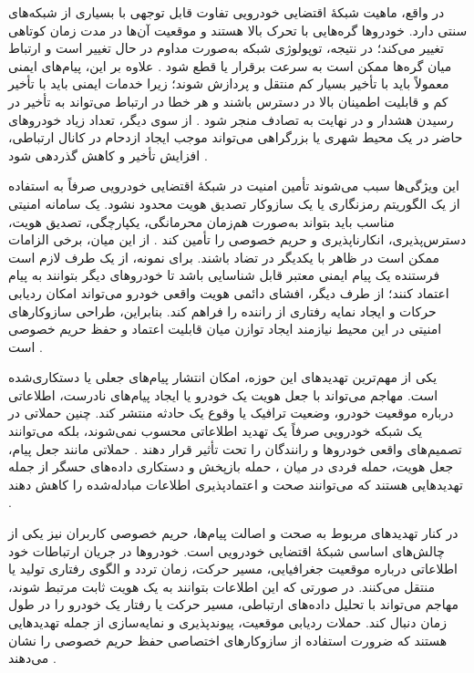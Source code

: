 \documentclass[12pt,a4paper]{article}
\begin{document}
در واقع، ماهیت شبکهٔ اقتضایی خودرویی تفاوت قابل توجهی با بسیاری از شبکه‌های سنتی دارد. خودرو‌ها گره‌هایی با تحرک بالا هستند و موقعیت آن‌ها در مدت زمان کوتاهی تغییر می‌کند؛ در نتیجه، توپولوژی شبکه به‌صورت مداوم در حال تغییر است و ارتباط میان گره‌ها ممکن است به سرعت برقرار یا قطع شود \cite{luConnectedVehiclesSolutions2014,hozouriOverviewVANETVehicular2023}. علاوه بر این، پیام‌های ایمنی معمولاً باید با تأخیر بسیار کم منتقل و پردازش شوند؛ زیرا خدمات ایمنی باید با تأخیر کم و قابلیت اطمینان بالا در دسترس باشند و هر خطا در ارتباط می‌تواند به تأخیر در رسیدن هشدار و در نهایت به تصادف منجر شود \cite{hozouriOverviewVANETVehicular2023}. از سوی دیگر، تعداد زیاد خودرو‌های حاضر در یک محیط شهری یا بزرگراهی می‌تواند موجب ایجاد ازدحام در کانال ارتباطی، افزایش تأخیر و کاهش گذردهی شود \cite{hozouriOverviewVANETVehicular2023,xuInternetVehiclesBig2018}.

این ویژگی‌ها سبب می‌شوند تأمین امنیت در شبکهٔ اقتضایی خودرویی صرفاً به استفاده از یک الگوریتم رمزنگاری یا یک سازوکار تصدیق هویت محدود نشود. یک سامانه امنیتی مناسب باید بتواند به‌صورت هم‌زمان محرمانگی، یکپارچگی، تصدیق هویت، دسترس‌پذیری، انکارناپذیری  و حریم خصوصی را تأمین کند \cite{farsimadanReviewSecurityChallenges2025,VanetSecurityPrivacy}. از این میان، برخی الزامات ممکن است در ظاهر با یکدیگر در تضاد باشند. برای نمونه، از یک طرف لازم است فرستنده یک پیام ایمنی معتبر قابل شناسایی باشد تا خودرو‌های دیگر بتوانند به پیام اعتماد کنند؛ از طرف دیگر، افشای دائمی هویت واقعی خودرو می‌تواند امکان ردیابی حرکات و ایجاد نمایه رفتاری از راننده را فراهم کند. بنابراین، طراحی سازوکار‌های امنیتی در این محیط نیازمند ایجاد توازن میان قابلیت اعتماد و حفظ حریم خصوصی است \cite{VanetSecurityPrivacy,rahmawatiagustinaSystematicLiteratureReview2025}.

یکی از مهم‌ترین تهدید‌های این حوزه، امکان انتشار پیام‌های جعلی یا دستکاری‌شده است. مهاجم می‌تواند با جعل هویت یک خودرو یا ایجاد پیام‌های نادرست، اطلاعاتی درباره موقعیت خودرو، وضعیت ترافیک یا وقوع یک حادثه منتشر کند. چنین حملاتی در یک شبکه خودرویی صرفاً یک تهدید اطلاعاتی محسوب نمی‌شوند، بلکه می‌توانند تصمیم‌های واقعی خودرو‌ها و رانندگان را تحت تأثیر قرار دهند \cite{farsimadanReviewSecurityChallenges2025}. حملاتی مانند جعل پیام، جعل هویت، حمله فردی در میان ، حمله بازپخش  و دستکاری داده‌های حسگر از جمله تهدید‌هایی هستند که می‌توانند صحت و اعتمادپذیری اطلاعات مبادله‌شده را کاهش دهند \cite{farsimadanReviewSecurityChallenges2025,VanetSecurityPrivacy}.

در کنار تهدید‌های مربوط به صحت و اصالت پیام‌ها، حریم خصوصی کاربران نیز یکی از چالش‌های اساسی شبکهٔ اقتضایی خودرویی است. خودرو‌ها در جریان ارتباطات خود اطلاعاتی درباره موقعیت جغرافیایی، مسیر حرکت، زمان تردد و الگوی رفتاری تولید یا منتقل می‌کنند. در صورتی که این اطلاعات بتوانند به یک هویت ثابت مرتبط شوند، مهاجم می‌تواند با تحلیل داده‌های ارتباطی، مسیر حرکت یا رفتار یک خودرو را در طول زمان دنبال کند. حملات ردیابی موقعیت، پیوندپذیری  و نمایه‌سازی  از جمله تهدید‌هایی هستند که ضرورت استفاده از سازوکار‌های اختصاصی حفظ حریم خصوصی را نشان می‌دهند \cite{farsimadanReviewSecurityChallenges2025,rahmawatiagustinaSystematicLiteratureReview2025}.
\end{document}

